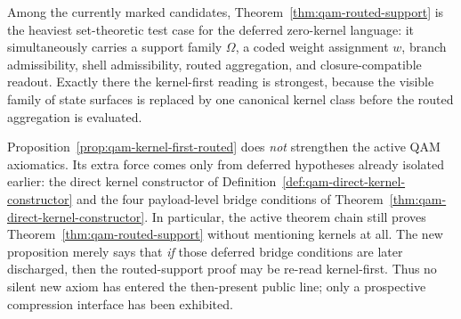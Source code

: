 \begin{remark}
Among the currently marked candidates, Theorem~\ref{thm:qam-routed-support} is the heaviest set-theoretic test case for the deferred zero-kernel language: it simultaneously carries a support family $\Omega$, a coded weight assignment $w$, branch admissibility, shell admissibility, routed aggregation, and closure-compatible readout. Exactly there the kernel-first reading is strongest, because the visible family of state surfaces is replaced by one canonical kernel class before the routed aggregation is evaluated.
\end{remark}


\begin{remark}\label{rem:qam-kernel-first-routed-audit}
Proposition~\ref{prop:qam-kernel-first-routed} does \emph{not} strengthen the active QAM axiomatics. Its extra force comes only from deferred hypotheses already isolated earlier: the direct kernel constructor of Definition~\ref{def:qam-direct-kernel-constructor} and the four payload-level bridge conditions of Theorem~\ref{thm:qam-direct-kernel-constructor}. In particular, the active theorem chain still proves Theorem~\ref{thm:qam-routed-support} without mentioning kernels at all. The new proposition merely says that \emph{if} those deferred bridge conditions are later discharged, then the routed-support proof may be re-read kernel-first. Thus no silent new axiom has entered the then-present public line; only a prospective compression interface has been exhibited.
\end{remark}

